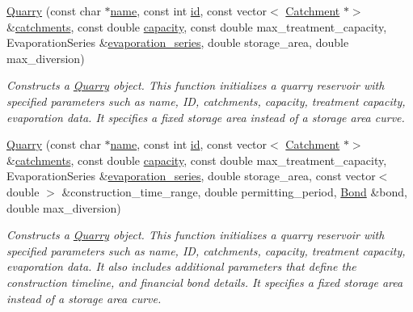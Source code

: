 \begin{DoxyCompactItemize}
\mbox{\hyperlink{classQuarry_a28c4db26230c2ff3f82c8c0f70f2f124}{Quarry}} (const char $\ast$\mbox{\hyperlink{classWaterSource_a846ea74c5b453d014f594d41fee8c765}{name}}, const int \mbox{\hyperlink{classWaterSource_a6eafe5dfefd317877d1244e8a7c6e742}{id}}, const vector$<$ \mbox{\hyperlink{classCatchment}{Catchment}} $\ast$$>$ \&\mbox{\hyperlink{classWaterSource_a8c18c34f23f8a06685c1d12f462ed830}{catchments}}, const double \mbox{\hyperlink{classWaterSource_a2ec257b415b248214a8bce7fc5267723}{capacity}}, const double max\+\_\+treatment\+\_\+capacity, Evaporation\+Series \&\mbox{\hyperlink{classReservoir_a2d2d9b302c13703309bb798d24136810}{evaporation\+\_\+series}}, double storage\+\_\+area, double max\+\_\+diversion)
\begin{DoxyCompactList}\small\item\em Constructs a \mbox{\hyperlink{classQuarry}{Quarry}} object. This function initializes a quarry reservoir with specified parameters such as name, ID, catchments, capacity, treatment capacity, evaporation data. It specifies a fixed storage area instead of a storage area curve. \end{DoxyCompactList}\item 
\mbox{\hyperlink{classQuarry_a561616791620a55709bfca645bc8cbad}{Quarry}} (const char $\ast$\mbox{\hyperlink{classWaterSource_a846ea74c5b453d014f594d41fee8c765}{name}}, const int \mbox{\hyperlink{classWaterSource_a6eafe5dfefd317877d1244e8a7c6e742}{id}}, const vector$<$ \mbox{\hyperlink{classCatchment}{Catchment}} $\ast$$>$ \&\mbox{\hyperlink{classWaterSource_a8c18c34f23f8a06685c1d12f462ed830}{catchments}}, const double \mbox{\hyperlink{classWaterSource_a2ec257b415b248214a8bce7fc5267723}{capacity}}, const double max\+\_\+treatment\+\_\+capacity, Evaporation\+Series \&\mbox{\hyperlink{classReservoir_a2d2d9b302c13703309bb798d24136810}{evaporation\+\_\+series}}, double storage\+\_\+area, const vector$<$ double $>$ \&construction\+\_\+time\+\_\+range, double permitting\+\_\+period, \mbox{\hyperlink{classBond}{Bond}} \&bond, double max\+\_\+diversion)
\begin{DoxyCompactList}\small\item\em Constructs a \mbox{\hyperlink{classQuarry}{Quarry}} object. This function initializes a quarry reservoir with specified parameters such as name, ID, catchments, capacity, treatment capacity, evaporation data. It also includes additional parameters that define the construction timeline, and financial bond details. It specifies a fixed storage area instead of a storage area curve. \end{DoxyCompactList}\item 

\end{DoxyCompactItemize}
